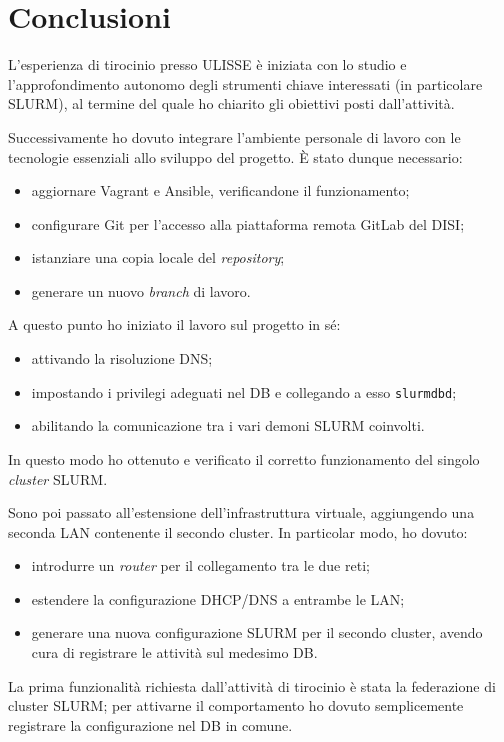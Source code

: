\documentclass[12pt,a4paper,twoside,openright]{book}
\begin{document}
\chapter{\textbf{Conclusioni}} %
L'esperienza di tirocinio presso \acf{ULISSE} è iniziata con lo studio e l'approfondimento autonomo degli strumenti chiave interessati (in particolare \ac{SLURM}), al termine del quale ho chiarito gli obiettivi posti dall'attività.

Successivamente ho dovuto integrare l'ambiente personale di lavoro con le tecnologie essenziali allo sviluppo del progetto. È stato dunque necessario:
\begin{itemize}
    \item aggiornare Vagrant e Ansible, verificandone il funzionamento;
    \item configurare Git per l'accesso alla piattaforma remota GitLab del \ac{DISI};
    \item istanziare una copia locale del \textit{repository};
    \item generare un nuovo \textit{branch} di lavoro.
\end{itemize}
A questo punto ho iniziato il lavoro sul progetto in sé:
\begin{itemize}
    \item attivando la risoluzione \ac{DNS};
    \item impostando i privilegi adeguati nel \ac{DB} e collegando a esso \texttt{slurmdbd};
    \item abilitando la comunicazione tra i vari demoni \ac{SLURM} coinvolti.
\end{itemize}
In questo modo ho ottenuto e verificato il corretto funzionamento del singolo \textit{cluster} \ac{SLURM}.

Sono poi passato all'estensione dell'infrastruttura virtuale, aggiungendo una seconda \ac{LAN} contenente il secondo cluster. In particolar modo, ho dovuto:
\begin{itemize}
    \item introdurre un \textit{router} per il collegamento tra le due reti;
    \item estendere la configurazione \ac{DHCP}/\ac{DNS} a entrambe le \ac{LAN};
    \item generare una nuova configurazione \ac{SLURM} per il secondo cluster, avendo cura di registrare le attività sul medesimo \ac{DB}.
\end{itemize}
La prima funzionalità richiesta dall'attività di tirocinio è stata la federazione di cluster \ac{SLURM}; per attivarne il comportamento ho dovuto semplicemente registrare la configurazione nel \ac{DB} in comune.
\end{document}
